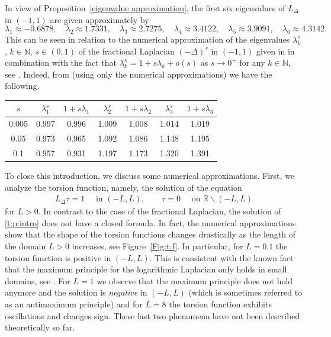 \documentclass[11 pt]{article}
\numberwithin{equation}{section}
\def\N{\mathbb{N}}
\def\R{\mathbb{R}}
\begin{document}
In view of Proposition~\ref{eigenvalue approximation}, the first six eigenvalues of $L_{\Delta}$ in $(-1,1)$ are given approximately by
\begin{equation*}
\lambda_1\approx -0.6878, \quad \lambda_2\approx 1.7331,\quad \lambda_3\approx 2.7275,\quad \lambda_4\approx 3.4122, \quad \lambda_5\approx 3.9091,\quad \lambda_6\approx 4.3142.
\end{equation*}
This can be seen in relation to the numerical approximation of the eigenvalues $\lambda_{k}^s$, $k\in\N$, $s\in(0,1)$ of the fractional Laplacian $(-\Delta)^s$ in $(-1,1)$ given in \cite{K12} in combination with the fact that  $\lambda_k^s=1+s\lambda_k+o(s)$ as $s\to 0^+$ for any $k\in\N$, see \cite{FJW22}. Indeed, from \cite[Table 1]{K12} (using only the numerical approximations) we have the following.
\begin{center}
\begin{tabular}{c|cc|cc|cc}
$s$ & $\lambda_1^s$ &$1+s\lambda_1$  & $\lambda_2^s$ &$1+s\lambda_2$ & $\lambda_3^s$ &$1+s\lambda_3$\\
\hline
0.005 & 0.997 & 0.996 & 1.009 & 1.008 & 1.014 & 1.019\\
0.05  & 0.973 & 0.965 & 1.092 & 1.086 & 1.148 & 1.195\\
0.1   & 0.957 & 0.931 & 1.197 & 1.173 & 1.320 & 1.391
\end{tabular}
\end{center}

To close this introduction, we discuss some numerical approximations.  First, we analyze the torsion function, namely, the solution of the equation
\begin{align}\label{t:p:intro}
 L_\Delta \tau = 1\quad \text{ in }(-L,L),\qquad \tau=0\quad \text{ on }\R\backslash (-L,L)
\end{align}
for $L>0$.  In contrast to the case of the fractional Laplacian, the solution of \eqref{t:p:intro} does not have a closed formula. In fact, the numerical approximations show that the shape of the torsion functions changes drastically as the length of the domain $L>0$ increases, see Figure~\ref{Fig:t:f}. In particular, for $L=0.1$ the torsion function is positive in $(-L,L)$.  This is consistent with the known fact that the maximum principle for the logarithmic Laplacian only holds in small domains, see \cite[Corollary 1.9]{CW19}. For $L=1$ we observe that the maximum principle does not hold anymore and the solution is \emph{negative} in $(-L,L)$ (which is sometimes referred to as an antimaximum principle) and for $L=8$ the torsion function exhibits oscillations and changes sign. These last two phenomena have not been described theoretically so far.
\end{document}
